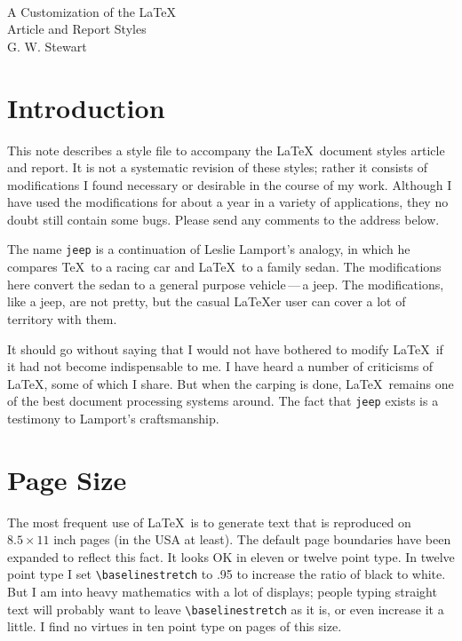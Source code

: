 \renewcommand{\baselinestretch}{.95}
\headheight 14pt
\cfoot{\thepage}
\underhead
\tighttoc
\thispagestyle{plain}
\numberbysection

\begin{center}
\large{}\smallskip\\
A Customization of the \LaTeX\\
Article and Report Styles
\smallskip\\
G.  W.  Stewart
\bigskip
\end{center}

\tableofcontents

\section{Introduction}

This note describes a style file to accompany the \LaTeX\ document
styles article and report.  It is not a systematic revision of these
styles; rather it consists of modifications I found necessary or
desirable in the course of my work.  Although I have used the
modifications for about a year in a variety of applications,
they no doubt still contain some bugs.  Please send any comments
to the address below.

The name \verb|jeep| is a continuation of Leslie Lamport's analogy,
in which he compares \TeX\ to a racing car and \LaTeX\ to a family
sedan.  The modifications here convert the sedan to a general purpose
vehicle\,---\,a jeep.  The modifications, like a jeep, are not pretty,
but the casual \LaTeX er user can cover a lot of territory
with them.

It should go without saying that I would not have bothered to modify
\LaTeX\ if it had not become indispensable to me.  I have heard a
number of criticisms of \LaTeX, some of which I share.  But when the
carping is done, \LaTeX\ remains one of the best document processing
systems around.  The fact that \verb|jeep| exists is a testimony to
Lamport's craftsmanship.

\section{Page Size}

The most frequent use of \LaTeX\ is to generate text that is
reproduced on $8.5\times 11$ inch pages (in the USA at least).  The
default page boundaries have been expanded to reflect this fact.  It
looks OK in eleven or twelve point type.  In twelve point type I set
\verb|\baselinestretch| to .95 to increase the ratio of black to
white.  But I am into heavy mathematics with a lot of displays;
people typing straight text will probably want to leave
\verb|\baselinestretch| as it is, or even increase it a little.
I find no virtues in ten point type on pages of this size.

